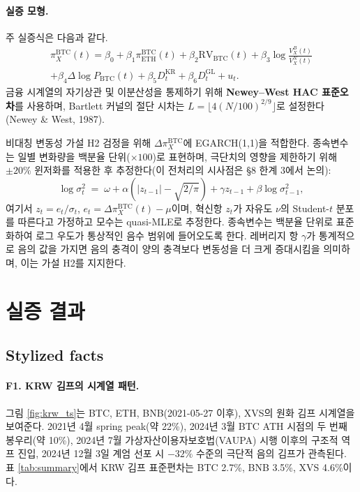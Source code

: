 \documentclass[11pt,a4paper]{article}
\begin{document}
\paragraph{실증 모형.}
주 실증식은 다음과 같다.
\begin{multline}
\pi^{\text{BTC}}_X(t) = \beta_0 + \beta_1\pi^{\text{BTC}}_{\text{ETH}}(t) + \beta_2\text{RV}_{\text{BTC}}(t)
                       + \beta_3\log\!\tfrac{V_X^B(t)}{V_X^N(t)} \\
                       + \beta_4\Delta\log P_{\text{BTC}}(t)
                       + \beta_5 D^{\text{KR}}_t + \beta_6 D^{\text{GL}}_t + u_t.
\label{eq:reg}
\end{multline}
금융 시계열의 자기상관 및 이분산성을 통제하기 위해 \textbf{Newey--West HAC 표준오차}를 사용하며,
Bartlett 커널의 절단 시차는 $L=\lfloor 4(N/100)^{2/9}\rfloor$로 설정한다 (Newey \& West, 1987).

비대칭 변동성 가설 H2 검정을 위해 $\Delta\pi^{\text{BTC}}_X$에 EGARCH(1,1)을 적합한다.
종속변수는 일별 변화량을 백분율 단위($\times 100$)로 표현하며, 극단치의 영향을 제한하기 위해
$\pm 20\%$ 윈저화를 적용한 후 추정한다(이 전처리의 시사점은 §8 한계 3에서 논의):
\begin{equation}
\log\sigma_t^2 \;=\; \omega + \alpha\!\left(|z_{t-1}|-\sqrt{2/\pi}\right) + \gamma z_{t-1} + \beta\log\sigma_{t-1}^2,
\label{eq:egarch}
\end{equation}
여기서 $z_t=e_t/\sigma_t$, $e_t=\Delta\pi^{\text{BTC}}_X(t)-\mu$이며, 혁신항 $z_t$가 자유도 $\nu$의 Student-$t$ 분포를 따른다고 가정하고 모수는 quasi-MLE로 추정한다. 종속변수는 백분율 단위로 표준화하여 로그 우도가 통상적인 음수 범위에 들어오도록 한다.
레버리지 항 $\gamma$가 통계적으로 음의 값을 가지면 음의 충격이 양의 충격보다 변동성을 더 크게
증대시킴을 의미하며, 이는 가설 H2를 지지한다.

\section{실증 결과}

\subsection{Stylized facts}

\paragraph{F1. KRW 김프의 시계열 패턴.}
그림 \ref{fig:krw_ts}는 BTC, ETH, BNB(2021-05-27 이후), XVS의 원화 김프 시계열을 보여준다.
2021년 4월 spring peak(약 22\%), 2024년 3월 BTC ATH 시점의 두 번째 봉우리(약 10\%),
2024년 7월 가상자산이용자보호법(VAUPA) 시행 이후의 구조적 역프 진입, 2024년 12월 3일 계엄 선포 시
$-32\%$ 수준의 극단적 음의 김프가 관측된다. 표 \ref{tab:summary}에서 KRW 김프 표준편차는
BTC 2.7\%, BNB 3.5\%, XVS 4.6\%이다.
\end{document}
